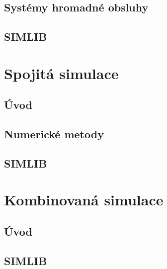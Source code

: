 \documentclass[11pt]{article}
\begin{document}
\subsection{Systémy hromadné obsluhy}
\label{sec:orgd63702c}
\subsection{SIMLIB}
\label{sec:orge43e6a1}

\section{Spojitá simulace}
\label{sec:org5bf3891}
\subsection{Úvod}
\label{sec:org0481c6b}
\subsection{Numerické metody}
\label{sec:orgfcc31ff}
\subsection{SIMLIB}
\label{sec:org8aba027}

\section{Kombinovaná simulace}
\label{sec:org184a42c}
\subsection{Úvod}
\label{sec:org0b27a8f}
\subsection{SIMLIB}
\label{sec:org417509e}
\end{document}
